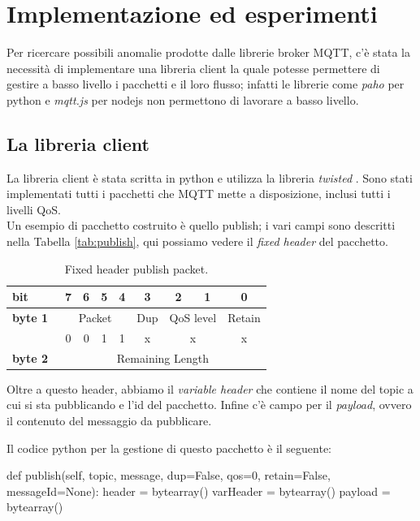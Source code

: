 \documentclass[Lau,binding=0.6cm,noexaminfo=true]{sapthesis}
\begin{document}
\chapter{Implementazione ed esperimenti}
\begin{large}
Per ricercare possibili anomalie prodotte dalle librerie broker MQTT, c'è stata la necessità di implementare una libreria client la quale potesse permettere di gestire a basso livello i pacchetti e il loro flusso; infatti le librerie come \textit{paho} per python e \textit{mqtt.js} per nodejs non permettono di lavorare a basso livello.

\section{La libreria client}
La libreria client è stata scritta in python e utilizza la libreria \textit{twisted} \cite{wiki:Twisted}. 
Sono stati implementati tutti i pacchetti che MQTT mette a disposizione, inclusi tutti i livelli QoS. \\
Un esempio di pacchetto costruito è quello publish; i vari campi sono descritti nella Tabella \ref{tab:publish}, qui possiamo vedere il \textit{fixed header} del pacchetto.

\begin{table}[h]
\caption{Fixed header publish packet.}
\label{tab:publishbytes}
\centering
\begin{tabular}{|l|c|c|c|c|c|c|c|c|}
\hline
\textbf{bit}     & 7 & 6 & 5 & 4 & 3   & 2 & 1 & 0       \\
\hline
\textbf{byte 1}  & \multicolumn{4}{|c|}{Packet} & Dup & \multicolumn{2}{|c|}{QoS level} & Retain  \\
\hline
        & 0 & 0 & 1 & 1 & x   & \multicolumn{2}{|c|}{x} & x \\
\hline
\textbf{byte 2}~ & \multicolumn{8}{|c|}{Remaining Length}                                                       \\
\hline
\end{tabular}
\end{table}

Oltre a questo header, abbiamo il \textit{variable header} che contiene il nome del topic a cui si sta pubblicando e l'id del pacchetto. Infine c'è campo per il \textit{payload}, ovvero il contenuto del messaggio da pubblicare.
\newpage

Il codice python per la gestione di questo pacchetto è il seguente:

\begin{python}
def publish(self, topic, message, dup=False, qos=0, retain=False, messageId=None):
    header = bytearray()
    varHeader = bytearray()
    payload = bytearray()
    

\end{python}
\end{large}
\end{document}

